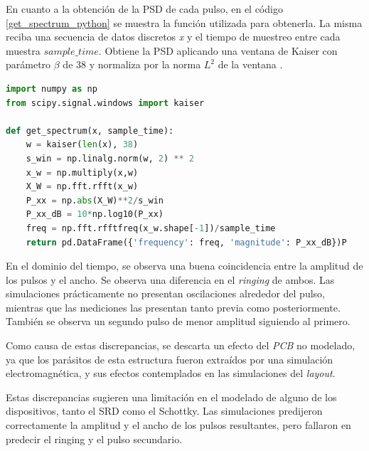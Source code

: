 En cuanto a la obtención de la PSD de cada pulso, en el código
\ref{get_spectrum_python} se muestra la función utilizada para obtenerla. La
misma reciba una secuencia de datos discretos \textit{x} y el tiempo de muestreo
entre cada muestra $sample\_time$. Obtiene la PSD aplicando una ventana de
Kaiser con parámetro $\beta$ de 38 y normaliza por la norma $L^2$ de la
ventana \cite{oppenheim1999dsp}.

\begin{lstlisting}[language=Python, style=PythonStyle, caption=Función para obtener PSD,
label=get_spectrum_python, float]
import numpy as np
from scipy.signal.windows import kaiser

def get_spectrum(x, sample_time):
    w = kaiser(len(x), 38)
    s_win = np.linalg.norm(w, 2) ** 2
    x_w = np.multiply(x,w)
    X_W = np.fft.rfft(x_w)
    P_xx = np.abs(X_W)**2/s_win
    P_xx_dB = 10*np.log10(P_xx)
    freq = np.fft.rfftfreq(x_w.shape[-1])/sample_time
    return pd.DataFrame({'frequency': freq, 'magnitude': P_xx_dB})P
\end{lstlisting}

En el dominio del tiempo, se observa una buena coincidencia entre la amplitud de
los pulsos y el ancho. Se observa una diferencia en el \textit{ringing} de
ambos.  Las simulaciones prácticamente no presentan oscilaciones alrededor del
pulso, mientras que las mediciones las presentan tanto previa como
posteriormente.  También se observa un segundo pulso de menor amplitud siguiendo
al primero.

Como causa de estas discrepancias, se descarta un efecto del \textit{PCB} no
modelado, ya que los parásitos de esta estructura fueron extraídos por una
simulación electromagnética, y sus efectos contemplados en las simulaciones del
\textit{layout}.

Estas  discrepancias sugieren una limitación en el modelado de alguno de los
dispositivos, tanto el SRD como el Schottky. Las simulaciones predijeron correctamente
la amplitud y el ancho de los pulsos resultantes, pero fallaron en predecir
el ringing y el pulso secundario.

